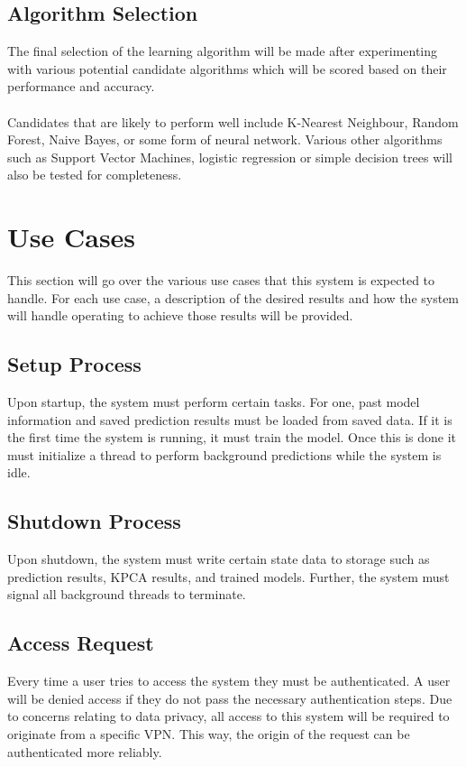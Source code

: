 \documentclass[titlepage]{article}
\begin{document}
\subsection{Algorithm Selection}
The final selection of the learning algorithm will be made after experimenting with various potential candidate algorithms which will be scored based on their performance and accuracy.\\~\\
Candidates that are likely to perform well include K-Nearest Neighbour, Random Forest, Naive Bayes, or some form of neural network. Various other algorithms such as Support Vector Machines, logistic regression or simple decision trees will also be tested for completeness.



\section{Use Cases}
This section will go over the various use cases that this system is expected to handle. For each use case, a description of the desired results and how the system will handle operating to achieve those results will be provided.
\subsection{Setup Process}
Upon startup, the system must perform certain tasks. For one, past model information and saved prediction results must be loaded from saved data. If it is the first time the system is running, it must train the model. Once this is done it must initialize a thread to perform background predictions while the system is idle.
\subsection{Shutdown Process}
Upon shutdown, the system must write certain state data to storage such as prediction results, KPCA results, and trained models. Further, the system must signal all background threads to terminate.
\subsection{Access Request}
Every time a user tries to access the system they must be authenticated. A user will be denied access if they do not pass the necessary authentication steps. Due to concerns relating to data privacy, all access to this system will be required to originate from a specific VPN. This way, the origin of the request can be authenticated more reliably.
\end{document}
